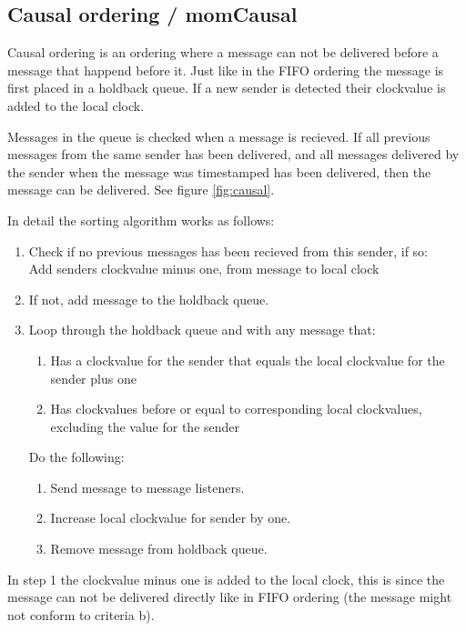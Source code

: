 \documentclass[english]{article}
\begin{document}
\subsection{Causal ordering / momCausal}
\label{mo-causal}
Causal ordering is an ordering where a message can not be delivered before a message that happend before it. Just like in the FIFO ordering the message is first placed in a holdback queue. If a new sender is detected their clockvalue is added to the local clock.

Messages in the queue is checked when a message is recieved. If all previous messages from the same sender has been delivered, and all messages delivered by the sender when the message was timestamped has been delivered, then the message can be delivered. See figure \vref{fig:causal}.

In detail the sorting algorithm works as follows:
\begin{enumerate}
\item Check if no previous messages has been recieved from this sender, if so:\\
	Add senders clockvalue minus one, from message to local clock
\item If not, add message to the holdback queue.
\item Loop through the holdback queue and with any message that:
	\begin{enumerate}
	\item Has a clockvalue for the sender that equals the local clockvalue for the sender plus one
	\item Has clockvalues before or equal to corresponding local clockvalues, excluding the value for the sender
	\end{enumerate}
	Do the following:
	\begin{enumerate}
	\item Send message to message listeners.
	\item Increase local clockvalue for sender by one.
	\item Remove message from holdback queue.
	\end{enumerate}
\end{enumerate}

In step 1 the clockvalue minus one is added to the local clock, this is since the message can not be delivered directly like in FIFO ordering (the message might not conform to criteria b). 
\end{document}
